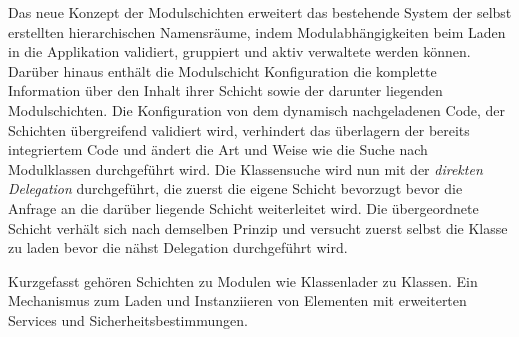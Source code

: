     Das neue Konzept der Modulschichten erweitert das bestehende System der selbst erstellten hierarchischen Namensräume, indem Modulabhängigkeiten beim Laden in die Applikation validiert, gruppiert und aktiv verwaltete werden können. Darüber hinaus enthält die Modulschicht Konfiguration die komplette Information über den Inhalt ihrer Schicht sowie der darunter liegenden Modulschichten. \newline
    Die Konfiguration von dem dynamisch nachgeladenen Code, der Schichten übergreifend validiert wird, verhindert das überlagern der bereits integriertem Code und ändert die Art und Weise wie die Suche nach Modulklassen durchgeführt wird. \newline
    Die Klassensuche wird nun mit der \textit{direkten Delegation} durchgeführt, die zuerst die eigene Schicht bevorzugt bevor die Anfrage an die darüber liegende Schicht weiterleitet wird. Die übergeordnete Schicht verhält sich nach demselben Prinzip und versucht zuerst selbst die Klasse zu laden bevor die nähst Delegation durchgeführt wird. \bigbreak

    Kurzgefasst gehören Schichten zu Modulen wie Klassenlader zu Klassen. Ein Mechanismus zum Laden und Instanziieren von Elementen mit erweiterten Services und Sicherheitsbestimmungen.\cite{javaMod9,parentDelegationModel,modulMitJava9}


